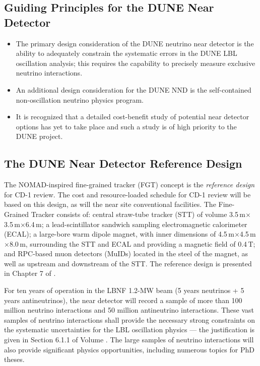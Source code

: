 \subsection{Guiding Principles for the DUNE Near Detector}

\begin{itemize}
\item  The primary design consideration of the DUNE neutrino near detector is the 
ability to adequately constrain the systematic errors in the DUNE LBL oscillation 
analysis; this requires the capability to precisely measure exclusive neutrino
interactions.

\item An additional design consideration for the DUNE NND is the self-contained non-oscillation 
neutrino physics program.

\item It is recognized that a detailed cost-benefit study of potential near detector options 
has yet to take place and such a study is of high priority to the DUNE project. 
\end{itemize}

\subsection{The DUNE Near Detector Reference Design }

The NOMAD-inspired fine-grained tracker (FGT) concept is the \textit{reference 
design} for CD-1 review. The cost and resource-loaded schedule for CD-1 review 
will be based on this design, as will the near site conventional facilities. The 
Fine-Grained Tracker consists of:  central straw-tube tracker (STT) of volume 
3.5\,m$\times$3.5\,m$\times$6.4\,m; a lead-scintillator sandwich sampling electromagnetic calorimeter 
(ECAL); a large-bore warm dipole magnet, with inner dimensions of 
4.5\,m$\times$4.5\,m$\times$8.0\,m, surrounding the STT and ECAL and providing a magnetic field of 0.4\,T; 
and RPC-based muon detectors (MuIDs) located in the steel of the magnet, as well 
as upstream and downstream of the STT. The reference 
design is presented in Chapter 
7 of \voldune. 

For ten years of operation in the LBNF 1.2-MW beam (5 years neutrinos + 5 years 
antineutrinos), the near detector will record a sample of more than 100 million 
neutrino interactions and 50 million antineutrino interactions. These vast samples 
of neutrino interactions shall provide the necessary strong constraints on the 
systematic uncertainties for the LBL oscillation physics --- the justification is 
given in Section 6.1.1 of Volume \volphys. The large samples of neutrino 
interactions will also provide significant physics opportunities, including 
numerous topics for PhD theses.  

